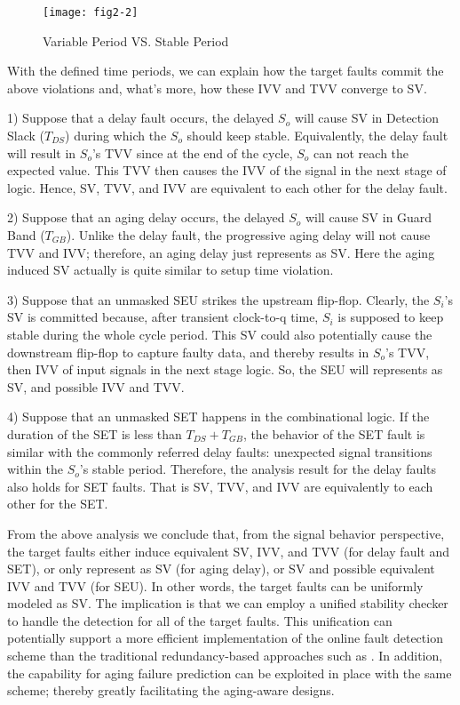 \begin{figure}[ht]
\centering
\texttt{[image: fig2-2]}
   \vspace{-0.5em}
   \caption{Variable Period VS. Stable Period}
   \label{tvts}
\end{figure}

With the defined time periods, we can explain how the target faults commit the above violations and, what's more, how these IVV and TVV converge to SV.

1) Suppose that a delay fault occurs, the delayed $S_o$ will cause SV in Detection Slack ($T_{DS}$) during which the $S_o$ should keep stable. Equivalently, the delay fault will result in $S_o$'s TVV since at the end of the cycle, $S_o$ can not reach the expected value. This TVV then causes the IVV of the signal in the next stage of logic. Hence, SV, TVV, and IVV are equivalent to each other for the delay fault.

2) Suppose that an aging delay occurs, the delayed $S_o$ will cause SV in Guard Band ($T_{GB}$). Unlike the delay fault, the progressive aging delay will not cause TVV and IVV; therefore, an aging delay just represents as SV. Here the aging induced SV actually is quite similar to setup time violation.

3) Suppose that an unmasked SEU strikes the upstream flip-flop. Clearly, the $S_i$'s SV is committed because, after transient clock-to-q time, $S_i$ is supposed to keep stable during the whole cycle period. This SV could also potentially cause the downstream flip-flop to capture faulty data, and thereby results in $S_o$'s TVV, then IVV of input signals in the next stage logic. So, the SEU will represents as SV, and possible IVV and TVV.

4) Suppose that an unmasked SET happens in the combinational logic. If the duration of the SET is less than $T_{DS}+T_{GB}$, the behavior of the SET fault is similar with the commonly referred delay faults: unexpected signal transitions within the $S_o$'s stable period. Therefore, the analysis result for the delay faults also holds for SET faults. That is SV, TVV, and IVV are equivalently to each other for the SET.

From the above analysis we conclude that, from the signal behavior perspective, the target faults either induce equivalent SV, IVV, and TVV (for delay fault and SET), or only represent as SV (for aging delay), or SV and possible equivalent IVV and TVV (for SEU). In other words, the target faults can be uniformly modeled as SV. The implication is that we can employ a unified stability checker to handle the detection for all of the target faults. This unification can potentially support a more efficient implementation of the online fault detection scheme than the traditional redundancy-based approaches such as \cite{Mitra_C05}\cite{Han_DT05}. In addition, the capability for aging failure prediction \cite{agarwal2007circuit}\cite{failure_prediction2_08} can be exploited in place with the same scheme; thereby greatly facilitating the aging-aware designs.

